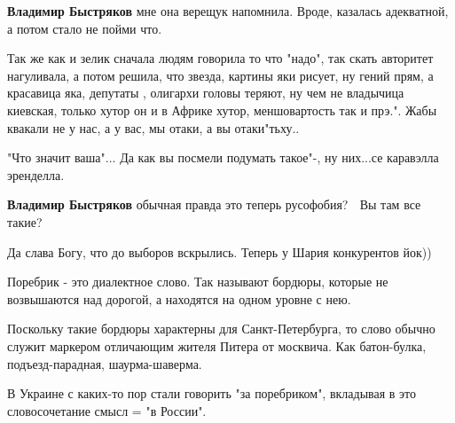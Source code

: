 \begin{itemize}
\begin{itemize}
\textbf{Владимир Быстряков} мне она верещук напомнила. Вроде, казалась адекватной, а потом стало не пойми что.

 

Так же как и зелик сначала людям говорила то что "надо", так скать авторитет
нагуливала, а потом решила, что звезда, картины яки рисует, ну гений прям, а
красавица яка, депутаты , олигархи головы теряют, ну чем не владычица киевская,
только хутор он и в Африке хутор, меншовартость так и прэ.". Жабы квакали не у
нас, а у вас, мы отаки, а вы отаки"тьху..

"Что значит ваша"... Да как вы посмели подумать такое"-, ну них...се каравэлла
эренделла.

 
\textbf{Владимир Быстряков} обычная правда это теперь русофобия? 🤔 Вы там все такие?

 
Да слава Богу, что до выборов вскрылись. Теперь у Шария конкурентов йок))

 

Поребрик - это диалектное слово. Так называют бордюры, которые не возвышаются
над дорогой, а находятся на одном уровне с нею.

Поскольку такие бордюры характерны для Санкт-Петербурга, то слово обычно служит
маркером отличающим жителя Питера от москвича. Как батон-булка,
подъезд-парадная, шаурма-шаверма.

В Украине с каких-то пор стали говорить "за поребриком", вкладывая в это
словосочетание смысл = "в России".

 

\end{itemize}
\end{itemize}
